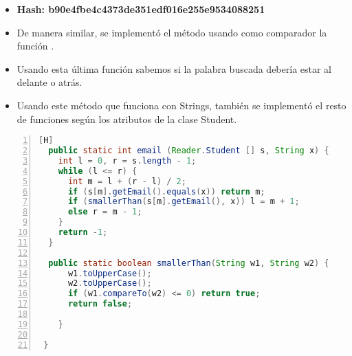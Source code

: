   \begin{itemize}
    \item \textbf{Hash: b90e4fbe4c4373de351edf016e255e9534088251}
    \item De manera similar, se implementó el método  usando como comparador la función .
    \item Usando esta última función sabemos si la palabra buscada debería estar al delante o atrás.
    \item Usando este método que funciona con Strings, también se implementó el resto de funciones según los atributos de la clase Student.
  \end{itemize}
  \begin{lstlisting}[language=Java, caption={Commit: Implementación para busqueda según email}, numbers=left, firstnumber=1][H]
  public static int email (Reader.Student [] s, String x) {
    int l = 0, r = s.length - 1;
    while (l <= r) {
      int m = l + (r - l) / 2; 
      if (s[m].getEmail().equals(x)) return m;
      if (smallerThan(s[m].getEmail(), x)) l = m + 1;
      else r = m - 1;
    }
    return -1;
  }
  
  public static boolean smallerThan(String w1, String w2) {
      w1.toUpperCase();
      w2.toUpperCase();
      if (w1.compareTo(w2) <= 0) return true;
      return false;

    }
     
 }
  \end{lstlisting}
